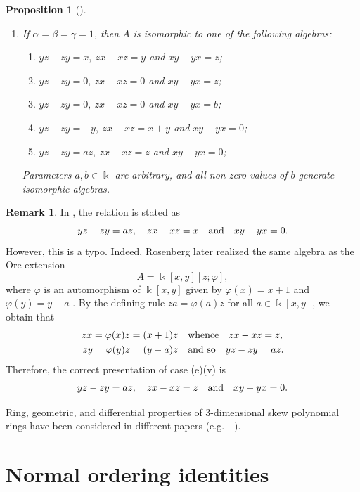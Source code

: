 \documentclass{amsart}
\newtheorem{proposition}[theorem]{Proposition}
\theoremstyle{definition}
\newtheorem{remark}[theorem]{Remark}
\theoremstyle{remark}
\numberwithin{equation}{section}
\begin{document}
\begin{proposition}[{\cite[Theorem C.4.3.1]{Rosenberg1995}}]
\begin{enumerate}
\item [\rm (5)] If $\alpha=\beta=\gamma=1$, then $A$ is isomorphic to one of the following algebras:
\begin{enumerate}
\item [\rm (i)] $yz-zy=x,\ zx-xz=y$ and $xy - yx = z${\rm ;}

\item [\rm (ii)] $yz-zy=0,\ zx-xz=0$ and $xy - yx = z${\rm ;}

\item [\rm (iii)] $yz-zy=0,\ zx-xz=0$ and $xy - yx = b${\rm ;}

\item [\rm (iv)] $yz-zy=-y,\ zx-xz=x+y$ and $xy-yx=0${\rm ;}

\item [\rm (v)] $yz-zy=az,\ zx-xz=z$ and $xy - yx = 0${\rm ;}
\end{enumerate}
Parameters $a,b\in \Bbbk$ are arbitrary,  and all non-zero values of
$b$ generate isomorphic algebras.
\end{enumerate}
\end{proposition}

\begin{remark}\label{Rosenberg}
In \cite[Theorem C4.3.1, case (e)(v), p. 101]{Rosenberg1995}, the relation is stated as
\[
yz - zy = az, \quad zx - xz = x \quad {\rm and} \quad xy - yx = 0.
\]
However, this is a typo. Indeed, Rosenberg later realized the same algebra as the Ore extension
\[
A = \Bbbk[x,y][z;\varphi],
\]
where $\varphi$ is an automorphism of $\Bbbk[x,y]$ given by $\varphi(x)=x+1$ and $\varphi(y)=y-a$ \cite[p. 108]{Rosenberg1995}. By the defining rule $za=\varphi(a)z$ for all $a\in \Bbbk[x,y]$, we obtain that 
\begin{align*}
zx = \varphi(x)z = (x+1)z & \quad {\rm whence} \quad zx - xz = z, \\
zy = \varphi(y)z = (y-a)z & \quad {\rm and\ so} \quad yz - zy = az.
\end{align*}
Therefore, the correct presentation of case (e)(v) is
\[
yz - zy = az, \quad zx - xz = z \quad {\rm and} \quad xy- yx = 0.
\]
\end{remark}

Ring, geometric, and differential properties of 3-dimensional skew polynomial rings have been considered in different papers (e.g. \cite{RedmanPhDThesis1996} - \cite{RubianoReyes2026DS3D}).


\section{Normal ordering identities}\label{Normalorderingcases}
\end{document}
